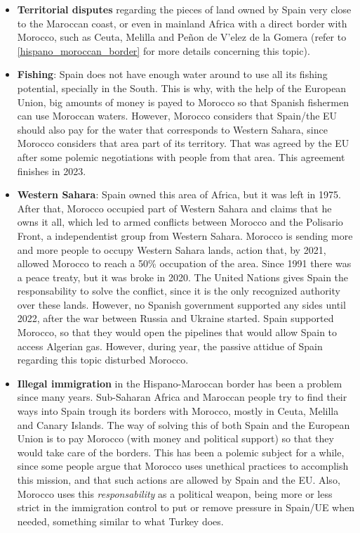 \documentclass[../my_knowledge.tex]{subfiles}
\begin{document}
\begin{itemize}
	\item \textbf{Territorial disputes} regarding the pieces of land owned by Spain very close to the Maroccan coast, or even in mainland Africa with a direct border with Morocco, such as Ceuta, Melilla and Pe\~non de V'elez de la Gomera (refer to \ref{hispano_moroccan_border} for more details concerning this topic).
	\item \textbf{Fishing}: Spain does not have enough water around to use all its fishing potential, specially in the South. This is why, with the help of the European Union, big amounts of money is payed to Morocco so that Spanish fishermen can use Moroccan waters. However, Morocco considers that Spain/the EU should also pay for the water that corresponds to Western Sahara, since Morocco considers that area part of its territory. That was agreed by the EU after some polemic negotiations with people from that area. This agreement finishes in 2023.
	\item \textbf{Western Sahara}: Spain owned this area of Africa, but it was left in 1975. After that, Morocco occupied part of Western Sahara and claims that he owns it all, which led to armed conflicts between Morocco and the Polisario Front, a independentist group from Western Sahara. Morocco is sending more and more people to occupy Western Sahara lands, action that, by 2021, allowed Morocco to reach a 50\% occupation of the area. Since 1991 there was a peace treaty, but it was broke in 2020. The United Nations gives Spain the responsability to solve the conflict, since it is the only recognized authority over these lands. However, no Spanish government supported any sides until 2022, after the war between Russia and Ukraine started. Spain supported Morocco, so that they would open the pipelines that would allow Spain to access Algerian gas. However, during year, the passive attidue of Spain regarding this topic disturbed Morocco.
	\item \textbf{Illegal immigration} in the Hispano-Maroccan border has been a problem since many years. Sub-Saharan Africa and Maroccan people try to find their ways into Spain trough its borders with Morocco, mostly in Ceuta, Melilla and Canary Islands. The way of solving this of both Spain and the European Union is to pay Morocco (with money and political support) so that they would take care of the borders. This has been a polemic subject for a while, since some people argue that Morocco uses unethical practices to accomplish this mission, and that such actions are allowed by Spain and the EU. Also, Morocco uses this \textit{responsability} as a political weapon, being more or less strict in the immigration control to put or remove pressure in Spain/UE when needed, something similar to what Turkey does. 
\end{itemize}
\end{document}
